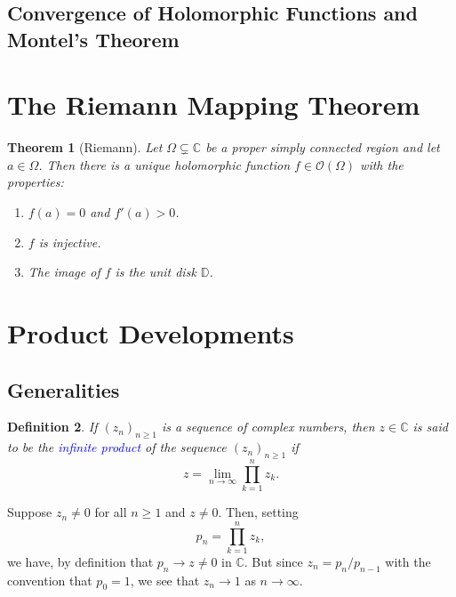 \documentclass[11pt]{article}
\theoremstyle{thmstyle}
\newtheorem{theorem}{Theorem}[section]
\theoremstyle{defstyle}
\newtheorem{definition}[theorem]{Definition}
\newcommand{\bbC}{\mathbb{C}}
\newcommand{\bbD}{\mathbb{D}} %
\newcommand{\scrO}{\mathscr{O}} %
\newcommand{\define}[1]{\textcolor{blue}{\textit{#1}}}
\renewcommand{\ge}{\geqslant}
\begin{document}
\subsection{Convergence of Holomorphic Functions and Montel's Theorem}



\section{The Riemann Mapping Theorem}

\begin{theorem}[Riemann]
    Let $\Omega\subsetneq\bbC$ be a proper simply connected region and let $a\in\Omega$. Then there is a unique holomorphic function $f\in\scrO(\Omega)$ with the properties: 
    \begin{enumerate}[label=(\roman*)]
        \item $f(a) = 0$ and $f'(a) > 0$. 
        \item $f$ is injective.
        \item The image of $f$ is the unit disk $\bbD$.
    \end{enumerate}
\end{theorem}

\section{Product Developments}

\subsection{Generalities}

\begin{definition}
    If $(z_n)_{n\ge 1}$ is a sequence of complex numbers, then $z\in\bbC$ is said to be the \define{infinite product} of the sequence $(z_n)_{n\ge 1}$ if 
    \begin{equation*}
        z = \lim_{n\to\infty}\prod_{k = 1}^n z_k.
    \end{equation*}
\end{definition}

Suppose $z_n\ne 0$ for all $n\ge 1$ and $z\ne 0$. Then, setting 
\begin{equation*}
    p_n = \prod_{k = 1}^n z_k,
\end{equation*}
we have, by definition that $p_n\to z\ne 0$ in $\bbC$. But since $z_n = p_n/p_{n - 1}$ with the convention that $p_0 = 1$, we see that $z_n\to 1$ as $n\to\infty$.
\end{document}
